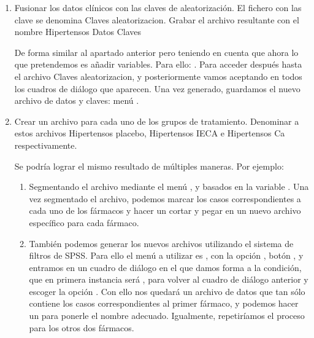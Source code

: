 \documentclass[a4paper]{article}
\begin{document}
\begin{enumerate}
\item Fusionar los datos clínicos con las claves de
aleatorización. El fichero con las clave se denomina
\textsf{Claves aleatorizacion}. Grabar el archivo resultante con
el nombre \textsf{Hipertensos Datos Claves}

\begin{indicacion}{
De forma similar al apartado anterior pero teniendo en cuenta que
ahora lo que pretendemos es añadir variables. Para ello:
. Para acceder
después hasta el archivo \textsf{Claves aleatorizacion}, y
posteriormente vamos aceptando en todos los cuadros de diálogo que
aparecen. Una vez generado, guardamos el nuevo archivo de datos y
claves: menú . }
\end{indicacion}

\item Crear un archivo para cada uno de los grupos de tratamiento.
Denominar a estos archivos \textsf{Hipertensos placebo},
\textsf{Hipertensos IECA} e \textsf{Hipertensos Ca}
respectivamente.

\begin{indicacion}{
Se podría lograr el mismo resultado de múltiples maneras. Por
ejemplo:
\begin{enumerate}
\item Segmentando el archivo mediante el menú , y  basados en
la variable . Una vez segmentado el archivo,
podemos marcar los casos correspondientes a cada uno de los fármacos
y hacer un cortar y pegar en un nuevo archivo específico para cada
fármaco.
\item También podemos generar los nuevos archivos utilizando el
sistema de filtros de SPSS. Para ello el menú a utilizar es
, con la opción , botón , y entramos en un cuadro
de diálogo en el que damos forma a la condición, que en primera
instancia será , para volver al cuadro de
diálogo anterior y escoger la opción . Con ello nos quedará un archivo de datos que tan
sólo contiene los casos correspondientes al primer fármaco, y
podemos hacer un  para ponerle el nombre
adecuado. Igualmente, repetiríamos el proceso para los otros dos
fármacos.
\end{enumerate}}
\end{indicacion}


\end{enumerate}
\end{document}

